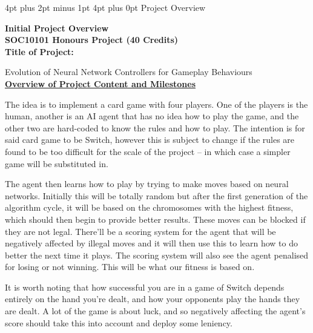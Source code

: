 \documentclass[12pt,a4paper]{article}
\makeatletter
\renewcommand\section{\@startsection {section}{1}{0mm} %
                               {4pt plus 2pt minus 1pt} %
                               {4pt plus 0pt} %
                               {\bfseries}}
\makeatother
\begin{document}
\newpage




\newpage
\begin{appendices}
\section{Project Overview}

\Large{\textbf{Initial Project Overview}\\

\textbf{SOC10101 Honours Project (40 Credits)}}\\                                                      

\large{\textbf{Title of Project:}}

\normalsize{Evolution of Neural Network Controllers for Gameplay Behaviours} \\

\underline{\textbf{Overview of Project Content and Milestones}}

The idea is to implement a card game with four players. One of the players is the human, another is an AI agent that has no idea how to play the game, and the other two are hard-coded to know the rules and how to play. The intention is for said card game to be Switch, however this is subject to change if the rules are found to be too difficult for the scale of the project – in which case a simpler game will be substituted in.


The agent then learns how to play by trying to make moves based on neural networks. Initially this will be totally random but after the first generation of the algorithm cycle, it will be based on the chromosomes with the highest fitness, which should then begin to provide better results. These moves can be blocked if they are not legal. There'll be a scoring system for the agent that will be negatively affected by illegal moves and it will then use this to learn how to do better the next time it plays. The scoring system will also see the agent penalised for losing or not winning. This will be what our fitness is based on. 


It is worth noting that how successful you are in a game of Switch depends entirely on the hand you’re dealt, and how your opponents play the hands they are dealt. A lot of the game is about luck, and so negatively affecting the agent’s score should take this into account and deploy some leniency. 



\end{appendices}
\end{document}
